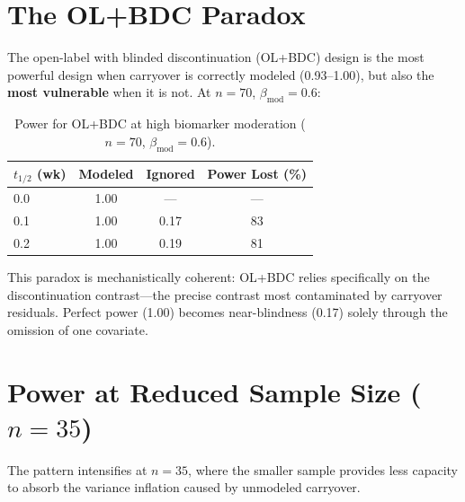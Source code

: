 \documentclass[11pt]{article}
\begin{document}
\section{The OL+BDC Paradox}

The open-label with blinded discontinuation (OL+BDC) design
is the most powerful design when carryover is correctly
modeled (0.93--1.00), but also the \textbf{most vulnerable}
when it is not.
At $n=70$, $\beta_{\mathrm{mod}}=0.6$:

\begin{table}[ht]
\centering
\caption{Power for OL+BDC at high biomarker moderation
($n=70$, $\beta_{\mathrm{mod}}=0.6$).}
\label{tab:olbdc_paradox}
\begin{tabular}{l ccc}
\toprule
$t_{1/2}$ (wk) & Modeled & Ignored
  & Power Lost (\%) \\
\midrule
0.0 & 1.00  & ---  & --- \\
0.1 & 1.00  & 0.17 & 83 \\
0.2 & 1.00  & 0.19 & 81 \\
\bottomrule
\end{tabular}
\end{table}

\noindent
This paradox is mechanistically coherent: OL+BDC relies
specifically on the discontinuation contrast---the precise
contrast most contaminated by carryover residuals.
Perfect power (1.00) becomes near-blindness (0.17) solely
through the omission of one covariate.

\section{Power at Reduced Sample Size ($n=35$)}

The pattern intensifies at $n=35$, where the smaller sample
provides less capacity to absorb the variance inflation
caused by unmodeled carryover.
\end{document}
